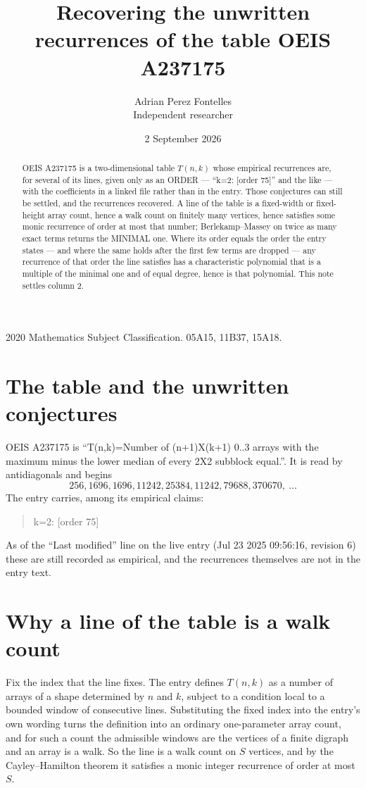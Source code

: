 \documentclass[11pt,a4paper]{article}
\title{Recovering the unwritten recurrences of the table OEIS A237175}
\author{Adrian Perez Fontelles\\ \small Independent researcher}
\date{2 September 2026}
\theoremstyle{plain}
\theoremstyle{definition}
\begin{document}
\maketitle

\begin{abstract}
OEIS A237175 is a two-dimensional table $T(n,k)$ whose empirical recurrences are, for several of
its lines, given only as an ORDER --- ``k=2: [order 75]'' and the like --- with the
coefficients in a linked file rather than in the entry. Those conjectures can still be settled,
and the recurrences recovered. A line of the table is a fixed-width or fixed-height array
count, hence a walk count on finitely many vertices, hence satisfies some monic recurrence of
order at most that number; Berlekamp--Massey on twice as many exact terms returns the MINIMAL
one. Where its order equals the order the entry states --- and where the same holds after the
first few terms are dropped --- any recurrence of that order the line satisfies has a
characteristic polynomial that is a multiple of the minimal one and of equal degree, hence is
that polynomial. This note settles column 2.
\end{abstract}

\noindent\small 2020 Mathematics Subject Classification. 05A15, 11B37, 15A18.\normalsize

\section{The table and the unwritten conjectures}

OEIS A237175 is ``T(n,k)=Number of (n+1)X(k+1) 0..3 arrays with the maximum minus the lower median of every 2X2 subblock equal.''. It is read by antidiagonals and begins
\[
256, 1696, 1696, 11242, 25384, 11242, 79688, 370670,\ \dots
\]
The entry carries, among its empirical claims:
\begin{quote}\small
k=2: [order 75]
\end{quote}
As of the ``Last modified'' line on the live entry (Jul 23 2025 09:56:16, revision 6) these are still
recorded as empirical, and the recurrences themselves are not in the entry text.

\section{Why a line of the table is a walk count}

Fix the index that the line fixes. The entry defines $T(n,k)$ as a number of arrays of a shape
determined by $n$ and $k$, subject to a condition local to a bounded window of consecutive
lines. Substituting the fixed index into the entry's own wording turns the definition into an
ordinary one-parameter array count, and for such a count the admissible windows are the
vertices of a finite digraph and an array is a walk. So the line is a walk count on $S$
vertices, and by the Cayley--Hamilton theorem it satisfies a monic integer recurrence of order
at most $S$.
\end{document}
